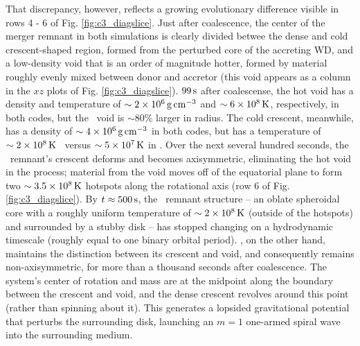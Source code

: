 
That discrepancy, however, reflects a growing evolutionary difference visible in rows 4 - 6 of Fig. \ref{fig:c3_diagslice}.  Just after coalescence, the center of the merger remnant in both simulations is clearly divided betwee the dense and cold crescent-shaped region, formed from the perturbed core of the accreting WD, and a low-density void that is an order of magnitude hotter, formed by material roughly evenly mixed between donor and accretor (this void appears as a column in the $xz$ plots of Fig. \ref{fig:c3_diagslice}).  $99\,\mathrm{s}$ after coalescense, the hot void has a density and temperature of $\sim2\times10^6\,\gcc$ and $\sim6\times10^8\,\mathrm{K}$, respectively, in both codes, but the \arepo\ void is $\sim80$\% larger in radius.  The cold crescent, meanwhile, has a density of $\sim4\times10^6\,\gcc$ in both codes, but has a temperature of $\sim2\times10^8\,\mathrm{K}$ \gasoline\ versus $\sim5\times10^7\,\mathrm{K}$ in \arepo.  Over the next several hundred seconds, the \gasoline\ remnant's crescent deforms and becomes axisymmetric, eliminating the hot void in the process; material from the void moves off of the equatorial plane to form two $\sim3.5\times10^8\,\mathrm{K}$ hotspots along the rotational axis (row 6 of Fig. \ref{fig:c3_diagslice}).  By $t\approx500\,\mathrm{s}$, the \gasoline\ remnant structure -- an oblate spheroidal core with a roughly uniform temperature of $\sim 2 \times 10^8\,\mathrm{K}$ (outside of the hotspots) and surrounded by a stubby disk -- has stopped changing on a hydrodynamic timescale (roughly equal to one binary orbital period).  \arepo, on the other hand, maintains the distinction between its crescent and void, and consequently remains non-axisymmetric, for more than a thousand seconds after coalescence.  The system's center of rotation and mass are at the midpoint along the boundary between the crescent and void, and the dense crescent revolves around this point (rather than spinning about it).  This generates a lopsided gravitational potential that perturbs the surrounding disk, launching an $m = 1$ one-armed spiral wave into the surrounding medium.

